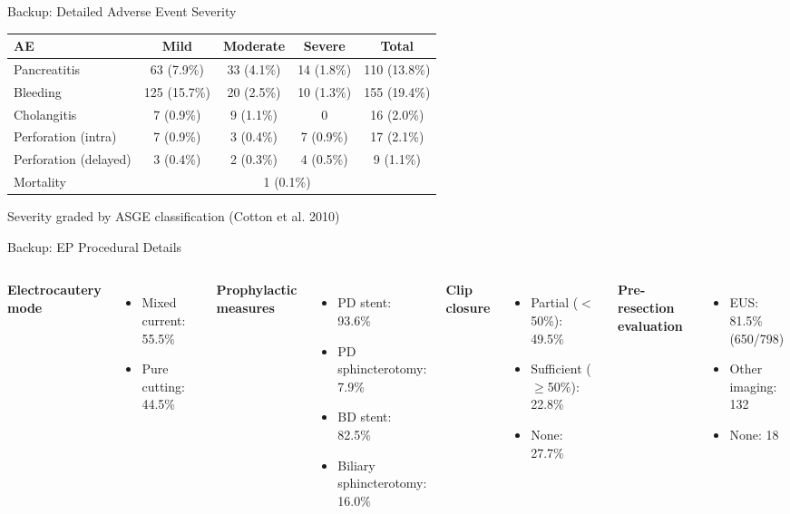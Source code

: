 \documentclass[aspectratio=169,10pt]{beamer}
\begin{document}
\begin{frame}{Backup: Detailed Adverse Event Severity}
\begin{center}
\small
\begin{tabular}{@{}lcccc@{}}
\toprule
\textbf{AE} & \textbf{Mild} & \textbf{Moderate} & \textbf{Severe} & \textbf{Total} \\
\midrule
Pancreatitis & 63 (7.9\%) & 33 (4.1\%) & 14 (1.8\%) & 110 (13.8\%) \\
Bleeding & 125 (15.7\%) & 20 (2.5\%) & 10 (1.3\%) & 155 (19.4\%) \\
Cholangitis & 7 (0.9\%) & 9 (1.1\%) & 0 & 16 (2.0\%) \\
Perforation (intra) & 7 (0.9\%) & 3 (0.4\%) & 7 (0.9\%) & 17 (2.1\%) \\
Perforation (delayed) & 3 (0.4\%) & 2 (0.3\%) & 4 (0.5\%) & 9 (1.1\%) \\
\midrule
Mortality & \multicolumn{4}{c}{1 (0.1\%)} \\
\bottomrule
\end{tabular}
\end{center}

\vspace{6pt}
Severity graded by ASGE classification (Cotton et al. 2010)
\end{frame}

\begin{frame}{Backup: EP Procedural Details}
\begin{columns}[T]
\textbf{Electrocautery mode}
\begin{itemize}
  \item Mixed current: 55.5\%
  \item Pure cutting: 44.5\%
\end{itemize}

\vspace{4pt}
\textbf{Prophylactic measures}
\begin{itemize}
  \item PD stent: 93.6\%
  \item PD sphincterotomy: 7.9\%
  \item BD stent: 82.5\%
  \item Biliary sphincterotomy: 16.0\%
\end{itemize}

\textbf{Clip closure}
\begin{itemize}
  \item Partial ($<$50\%): 49.5\%
  \item Sufficient ($\geq$50\%): 22.8\%
  \item None: 27.7\%
\end{itemize}

\vspace{4pt}
\textbf{Pre-resection evaluation}
\begin{itemize}
  \item EUS: 81.5\% (650/798)
  \item Other imaging: 132
  \item None: 18
\end{itemize}
\end{columns}
\end{frame}
\end{document}
